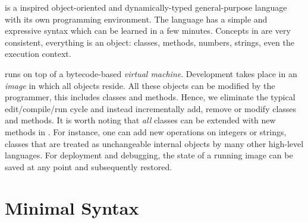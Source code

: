 


\PH is a \ST inspired object-oriented and dynamically-typed general-purpose language with its own programming environment.
The language has a simple and expressive syntax which can be learned in a few minutes.
Concepts in \PH are very consistent, everything is an object: classes, methods, numbers, strings, even the execution context.

\PH runs on top of a bytecode-based \emph{virtual machine}.
Development takes place in an \emph{image} in which all objects reside.
All these objects can be modified by the programmer, this includes classes and methods.
Hence, we eliminate the typical edit/compile/run cycle and instead incrementally add, remove or modify classes and methods.
It is worth noting that \emph{all} classes can be extended with new methods in \PH.
For instance, one can add new operations on integers or strings, classes that are treated as unchangeable internal objects by many other high-level languages.
For deployment and debugging, the state of a running image can be saved at any point and subsequently restored.


\section{Minimal Syntax}

